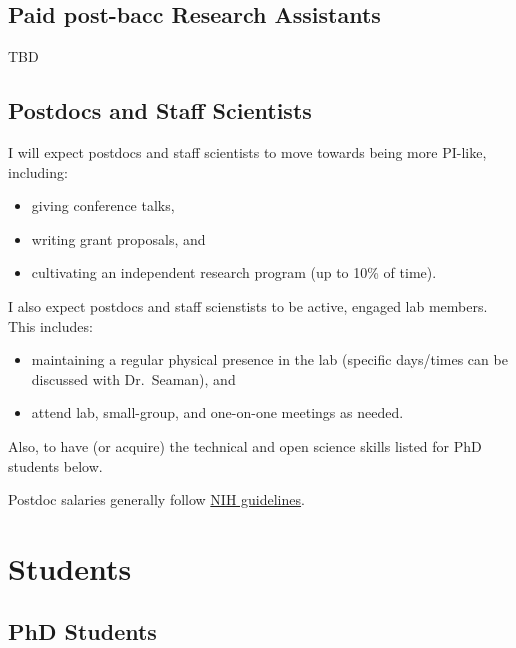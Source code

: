 \documentclass[
]{book}
\providecommand{\tightlist}{%
  \setlength{\itemsep}{0pt}\setlength{\parskip}{0pt}}
\begin{document}
\hypertarget{paid-post-bacc-research-assistants}{%
\subsection{Paid post-bacc Research Assistants}\label{paid-post-bacc-research-assistants}}

TBD

\hypertarget{postdocs-and-staff-scientists}{%
\subsection{Postdocs and Staff Scientists}\label{postdocs-and-staff-scientists}}

I will expect postdocs and staff scientists to move towards being more PI-like, including:

\begin{itemize}
\tightlist
\item
  giving conference talks,\\
\item
  writing grant proposals, and\\
\item
  cultivating an independent research program (up to 10\% of time).
\end{itemize}

I also expect postdocs and staff scienstists to be active, engaged lab members. This includes:

\begin{itemize}
\tightlist
\item
  maintaining a regular physical presence in the lab (specific days/times can be discussed with Dr.~Seaman), and
\item
  attend lab, small-group, and one-on-one meetings as needed.
\end{itemize}

Also, to have (or acquire) the technical and open science skills listed for PhD students below.

Postdoc salaries generally follow \href{https://www.niaid.nih.gov/grants-contracts/salary-cap-and-stipend-levels-announced}{NIH guidelines}.

\hypertarget{students}{%
\section{Students}\label{students}}

\hypertarget{phd-students}{%
\subsection{PhD Students}\label{phd-students}}
\end{document}
